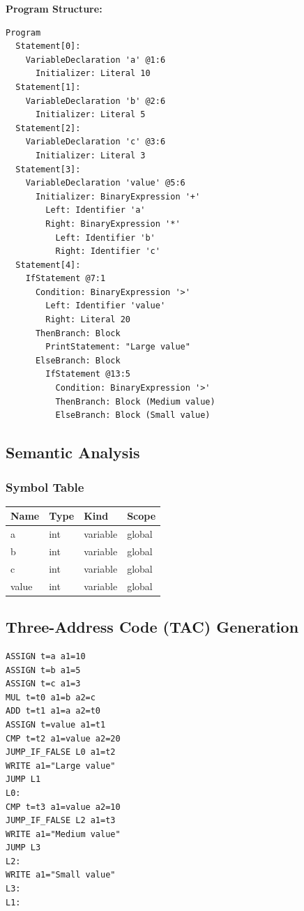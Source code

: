 \documentclass[12pt,a4paper]{report}
\begin{document}
\textbf{Program Structure:}
\begin{verbatim}
Program
  Statement[0]:
    VariableDeclaration 'a' @1:6
      Initializer: Literal 10
  Statement[1]:
    VariableDeclaration 'b' @2:6
      Initializer: Literal 5
  Statement[2]:
    VariableDeclaration 'c' @3:6
      Initializer: Literal 3
  Statement[3]:
    VariableDeclaration 'value' @5:6
      Initializer: BinaryExpression '+'
        Left: Identifier 'a'
        Right: BinaryExpression '*'
          Left: Identifier 'b'
          Right: Identifier 'c'
  Statement[4]:
    IfStatement @7:1
      Condition: BinaryExpression '>'
        Left: Identifier 'value'
        Right: Literal 20
      ThenBranch: Block
        PrintStatement: "Large value"
      ElseBranch: Block
        IfStatement @13:5
          Condition: BinaryExpression '>'
          ThenBranch: Block (Medium value)
          ElseBranch: Block (Small value)
\end{verbatim}

\subsection{Semantic Analysis}

\subsubsection{Symbol Table}

\begin{center}
\begin{tabular}{|l|l|l|l|}
\hline
\textbf{Name} & \textbf{Type} & \textbf{Kind} & \textbf{Scope} \\
\hline
a & int & variable & global \\
b & int & variable & global \\
c & int & variable & global \\
value & int & variable & global \\
\hline
\end{tabular}
\end{center}

\subsection{Three-Address Code (TAC) Generation}

\begin{lstlisting}[caption={TAC for Program 2}]
ASSIGN t=a a1=10
ASSIGN t=b a1=5
ASSIGN t=c a1=3
MUL t=t0 a1=b a2=c
ADD t=t1 a1=a a2=t0
ASSIGN t=value a1=t1
CMP t=t2 a1=value a2=20
JUMP_IF_FALSE L0 a1=t2
WRITE a1="Large value"
JUMP L1
L0:
CMP t=t3 a1=value a2=10
JUMP_IF_FALSE L2 a1=t3
WRITE a1="Medium value"
JUMP L3
L2:
WRITE a1="Small value"
L3:
L1:
\end{lstlisting}
\end{document}
